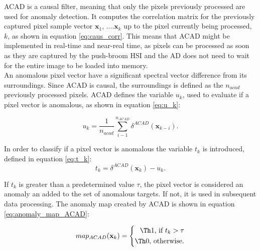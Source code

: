 ACAD is a causal filter, meaning that only the pixels previously processed are used for anomaly detection.  It computes the correlation matrix for the previously captured pixel sample vector {$\textbf{x}_1$, ....$\textbf{x}_k$} up to the pixel currently being processed, $k$, as shown in equation \ref{eq:caus_corr}. This means that ACAD might be implemented in real-time and near-real time, as pixels can be processed as soon as they are captured by the push-broom HSI and the AD does not need to wait for the entire image to be loaded into memory. \\

An anomalous pixel vector have a significant spectral vector difference from its surroundings. Since ACAD is causal, the surroundings is defined as the $n_{acad}$ previously processed pixels. %
ACAD defines the variable $u_k$, used to evaluate if a pixel vector is anomalous, as shown in  equation \ref{eq:u_k}: 

\begin{equation}
    u_k = \frac{1}{n_{acad}}\sum_{i-1}^{n_{ACAD}}  \delta^{ACAD}(\textbf{x}_{k-i}).
    \label{eq:u_k}
\end{equation}

 In order to classify if a pixel vector is anomalous the variable $t_k$ is introduced, defined in equation \ref{eq:t_k}:
\begin{equation}
    t_k = \delta^{ACAD}(\textbf{x}_{k}) - u_k.
    \label{eq:t_k}
\end{equation}

 If $t_k$ is greater than a predetermined value $\tau$, the pixel vector is considered an anomaly an added to the set of anomalous targets. If not, it is used in subsequent data processing. 
The anomaly map created by ACAD is shown in equation \ref{eq:anomaly_map_ACAD}:
    

\begin{equation}
    map_{ACAD}(\textbf{x}_{k}) =
   \left\{
   \begin{aligned}
    \Th 1\text{, if } t_k> \tau \\%
     \Th 0\text{, otherwise.}%
   \end{aligned}
   \right.
   \label{eq:anomaly_map_ACAD}
\end{equation}



